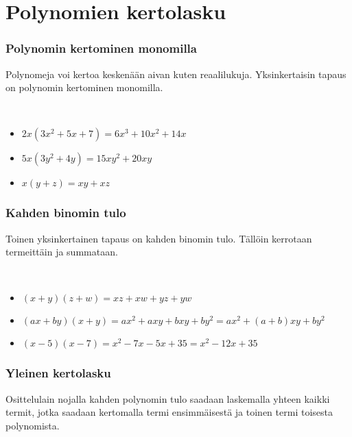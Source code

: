 \chapter{Polynomien kertolasku}

\subsection*{Polynomin kertominen monomilla}

Polynomeja voi kertoa keskenään aivan kuten reaalilukuja. Yksinkertaisin tapaus on polynomin kertominen monomilla.

\begin{esimerkki}
\qquad \\
\begin{itemize}
    \item $2x(3x^2+5x+7) = 6x^3+10x^2+14x$
    \item $5x(3y^2+4y) = 15xy^2+20xy$
    \item $x(y+z) = xy+xz$
\end{itemize}
\end{esimerkki}

\subsection*{Kahden binomin tulo}

Toinen yksinkertainen tapaus on kahden binomin tulo. Tällöin kerrotaan termeittäin ja summataan.

\begin{esimerkki}
\qquad \\
\begin{itemize}
    \item $(x+y)(z+w) = xz+xw+yz+yw$
    \item $(ax+by)(x+y) = ax^2+axy+bxy+by^2 = ax^2+(a+b)xy+by^2$
    \item $(x-5)(x-7) = x^2-7x-5x+35 = x^2-12x+35$
\end{itemize}
\end{esimerkki}

\subsection*{Yleinen kertolasku}

Osittelulain nojalla kahden polynomin tulo saadaan laskemalla yhteen kaikki
termit, jotka saadaan kertomalla termi ensimmäisestä ja toinen termi toisesta
polynomista.

\newcommand{\pbezier}[4]{
	\pgfmathsetmacro{\PBxa}{#1}
	\pgfmathsetmacro{\PBxb}{#2}
	\pgfmathsetmacro{\PBya}{#3}
	\pgfmathsetmacro{\PByb}{#3+#4}
	\pgfmathsetmacro{\PBca}{0.8 * \PBxa + 0.2 * \PBxb}
	\pgfmathsetmacro{\PBcb}{0.2 * \PBxa + 0.8 * \PBxb}
	\draw[color=red] (\PBxa, \PBya) .. controls (\PBca, \PByb) and (\PBcb, \PByb) .. (\PBxb, \PBya);
}

